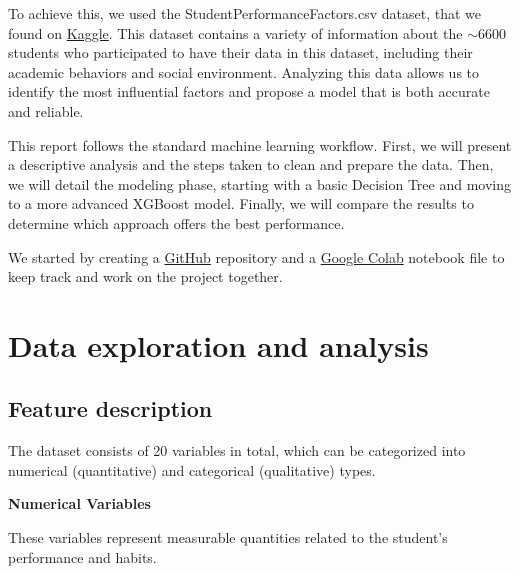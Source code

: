 \documentclass[a4paper,12pt]{article}
\begin{document}
To achieve this, we used the StudentPerformanceFactors.csv dataset, that we found on \href{https://www.kaggle.com/datasets/anassarfraz13/student-success-factors-and-insights/data }{Kaggle}. This dataset contains a variety of information about the $\sim$6600 students who participated to have their data in this dataset, including their academic behaviors and social environment. Analyzing this data allows us to identify the most influential factors and propose a model that is both accurate and reliable.

This report follows the standard machine learning workflow. First, we will present a descriptive analysis and the steps taken to clean and prepare the data. Then, we will detail the modeling phase, starting with a basic Decision Tree and moving to a more advanced XGBoost model. Finally, we will compare the results to determine which approach offers the best performance.

We started by creating a \href{https://github.com/maxbaumberger/gradesprediction/}{GitHub} repository and a \href{https://colab.research.google.com/drive/1d1VkLdJjlsVYWFKxfuNtNhik5k-nF-bh}{Google Colab} notebook file to keep track and work on the project together.

\newpage
\section{Data exploration and analysis}

\subsection{Feature description}
The dataset consists of 20 variables in total, which can be categorized into numerical (quantitative) and categorical (qualitative) types.

\textbf{Numerical Variables}

These variables represent measurable quantities related to the student's performance and habits.
\end{document}

